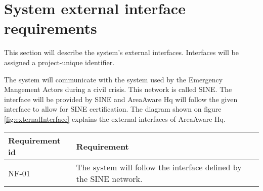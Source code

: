 \FloatBarrier
\newpage

\section{System external interface requirements}
This section will describe the system’s external interfaces. Interfaces will be assigned a project-unique identifier. 

The system will communicate with the system used by the Emergency Mangement Actors during a civil crisis. This network is called SINE. The interface will be provided by SINE and AreaAware Hq will follow the given interface to allow for SINE certification. The diagram shown on figure \ref{fig:externalInterface} explains the external interfaces of AreaAware Hq.


\begin{longtable}{| p{3.2cm} |  p{10cm} | }
	\hline
	\textbf{Requirement id} &  \textbf{Requirement } \\
	\hline
	NF-01 & The system will follow the interface defined by the SINE network.  \\
	\hline
\end{longtable}





